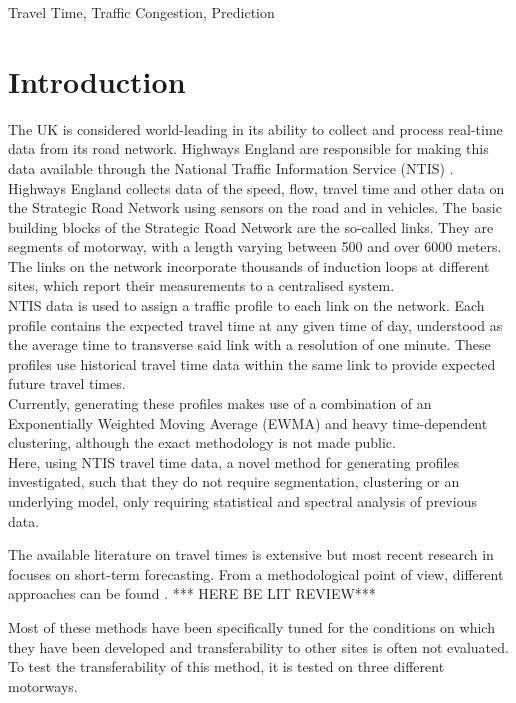 \documentclass[conference, letterpaper]{IEEEtran}
\begin{document}
\begin{IEEEkeywords}
Travel Time, Traffic Congestion, Prediction
\end{IEEEkeywords}

\section{Introduction}
The UK is considered world-leading in its ability to collect and process real-time data from its road network. 
Highways England are responsible for making this data available through the National Traffic Information Service (NTIS) \cite{NTIS}. 
Highways England collects data of the speed, flow, travel time and other data on the Strategic Road Network using sensors on the road and in vehicles. 
The basic building blocks of the Strategic Road Network are the so-called links. 
They are segments of motorway, with a length varying between 500 and over 6000 meters. 
The links on the network incorporate thousands of induction loops at different sites, which report their measurements to a centralised system.\\

NTIS data is used to assign a traffic profile to each link on the network. 
Each profile contains the expected travel time at any given time of day, understood as the average time to transverse said link with a resolution of one minute.
These profiles use historical travel time data within the same link to provide expected future travel times.\\

Currently, generating these profiles makes use of a combination of an Exponentially Weighted Moving Average (EWMA) and heavy time-dependent clustering, although the exact methodology is not made public. \\

Here, using NTIS travel time data, a novel method for generating profiles investigated, such that they do not require segmentation, clustering or an underlying model, only requiring statistical and spectral analysis of previous data.


The available literature on travel times is extensive but most recent research in focuses on short-term forecasting. From a methodological point of view, different approaches can be found .
*** HERE BE LIT REVIEW***

Most of these methods have been specifically tuned for the conditions on which they have been developed and transferability to other sites is often not evaluated.
To test the transferability of this method, it is tested on three different motorways.
\end{document}
